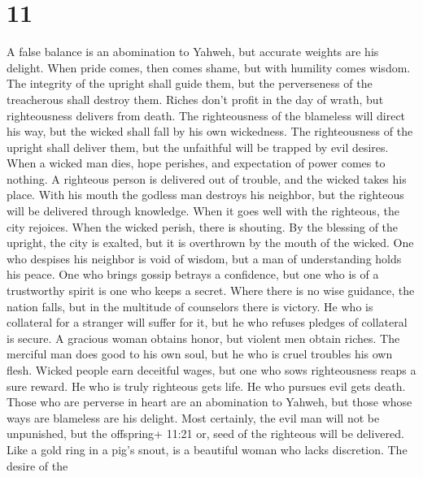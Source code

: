 \hypertarget{section-10}{%
\section{11}\label{section-10}}

 A false balance is an abomination to Yahweh, but accurate
weights are his delight.  When pride comes, then comes
shame, but with humility comes wisdom.  The integrity of the
upright shall guide them, but the perverseness of the treacherous shall
destroy them.  Riches don't profit in the day of wrath, but
righteousness delivers from death.  The righteousness of the
blameless will direct his way, but the wicked shall fall by his own
wickedness.  The righteousness of the upright shall deliver
them, but the unfaithful will be trapped by evil desires. 
When a wicked man dies, hope perishes, and expectation of power comes to
nothing.  A righteous person is delivered out of trouble,
and the wicked takes his place.  With his mouth the godless
man destroys his neighbor, but the righteous will be delivered through
knowledge.  When it goes well with the righteous, the city
rejoices. When the wicked perish, there is shouting.  By
the blessing of the upright, the city is exalted, but it is overthrown
by the mouth of the wicked.  One who despises his neighbor
is void of wisdom, but a man of understanding holds his peace.
 One who brings gossip betrays a confidence, but one who is
of a trustworthy spirit is one who keeps a secret.  Where
there is no wise guidance, the nation falls, but in the multitude of
counselors there is victory.  He who is collateral for a
stranger will suffer for it, but he who refuses pledges of collateral is
secure.  A gracious woman obtains honor, but violent men
obtain riches.  The merciful man does good to his own soul,
but he who is cruel troubles his own flesh.  Wicked people
earn deceitful wages, but one who sows righteousness reaps a sure
reward.  He who is truly righteous gets life. He who
pursues evil gets death.  Those who are perverse in heart
are an abomination to Yahweh, but those whose ways are blameless are his
delight.  Most certainly, the evil man will not be
unpunished, but the offspring+ 11:21 or, seed of the righteous will be
delivered.  Like a gold ring in a pig's snout, is a
beautiful woman who lacks discretion.  The desire of the
